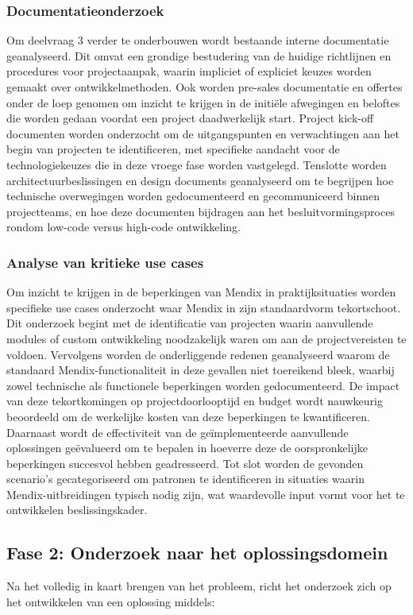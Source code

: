 \subsubsection{Documentatieonderzoek}
Om deelvraag 3 verder te onderbouwen wordt bestaande interne documentatie geanalyseerd. Dit omvat een grondige bestudering van de huidige richtlijnen en procedures voor projectaanpak, waarin impliciet of expliciet keuzes worden gemaakt over ontwikkelmethoden. Ook worden pre-sales documentatie en offertes onder de loep genomen om inzicht te krijgen in de initiële afwegingen en beloftes die worden gedaan voordat een project daadwerkelijk start. Project kick-off documenten worden onderzocht om de uitgangspunten en verwachtingen aan het begin van projecten te identificeren, met specifieke aandacht voor de technologiekeuzes die in deze vroege fase worden vastgelegd. Tenslotte worden architectuurbeslissingen en design documents geanalyseerd om te begrijpen hoe technische overwegingen worden gedocumenteerd en gecommuniceerd binnen projectteams, en hoe deze documenten bijdragen aan het besluitvormingsproces rondom low-code versus high-code ontwikkeling.
\subsubsection{Analyse van kritieke use cases}
Om inzicht te krijgen in de beperkingen van Mendix in praktijksituaties worden specifieke use cases onderzocht waar Mendix in zijn standaardvorm tekortschoot. Dit onderzoek begint met de identificatie van projecten waarin aanvullende modules of custom ontwikkeling noodzakelijk waren om aan de projectvereisten te voldoen. Vervolgens worden de onderliggende redenen geanalyseerd waarom de standaard Mendix-functionaliteit in deze gevallen niet toereikend bleek, waarbij zowel technische als functionele beperkingen worden gedocumenteerd. De impact van deze tekortkomingen op projectdoorlooptijd en budget wordt nauwkeurig beoordeeld om de werkelijke kosten van deze beperkingen te kwantificeren. Daarnaast wordt de effectiviteit van de geïmplementeerde aanvullende oplossingen geëvalueerd om te bepalen in hoeverre deze de oorspronkelijke beperkingen succesvol hebben geadresseerd. Tot slot worden de gevonden scenario's gecategoriseerd om patronen te identificeren in situaties waarin Mendix-uitbreidingen typisch nodig zijn, wat waardevolle input vormt voor het te ontwikkelen beslissingskader.
\subsection{Fase 2: Onderzoek naar het oplossingsdomein}
Na het volledig in kaart brengen van het probleem, richt het onderzoek zich op het ontwikkelen van een oplossing middels:
